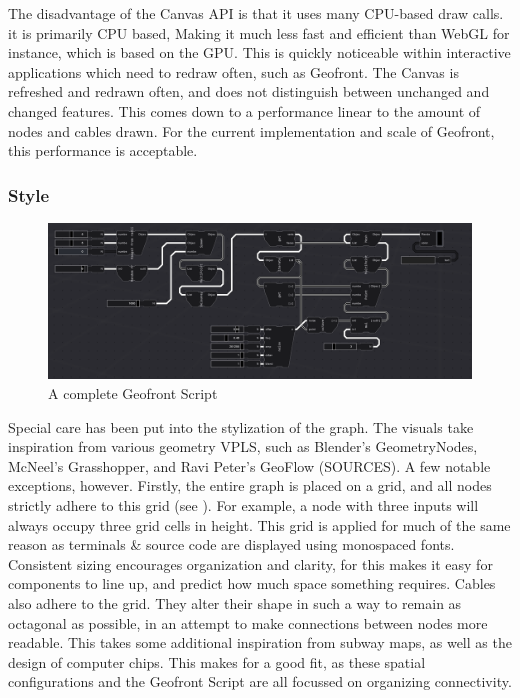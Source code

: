 The disadvantage of the Canvas API is that it uses many CPU-based draw calls. it is primarily CPU based, Making it much less fast and efficient than WebGL for instance, which is based on the GPU. 
This is quickly noticeable within interactive applications which need to redraw often, such as Geofront. 
The Canvas is refreshed and redrawn often, and does not distinguish between unchanged and changed features. 
This comes down to a performance linear to the amount of nodes and cables drawn. For the current implementation and scale of Geofront, this performance is acceptable. 

\subsubsection*{Style}

\begin{figure}
  \centering
  \graphicspath{ {../../assets/images/implementation/} }
  \includegraphics[width=\linewidth]{a-full-graph.png}
  \caption[Shim Classes]{A complete Geofront Script}
  \label{fig:a-full-graph}
\end{figure}

Special care has been put into the stylization of the graph.
The visuals take inspiration from various geometry VPLS, such as Blender's GeometryNodes, McNeel's Grasshopper, and Ravi Peter's GeoFlow (SOURCES). 
A few notable exceptions, however. 
Firstly, the entire graph is placed on a grid, and all nodes strictly adhere to this grid (see ). 
For example, a node with three inputs will always occupy three grid cells in height. 
This grid is applied for much of the same reason as terminals \& source code are displayed using monospaced fonts. 
Consistent sizing encourages organization and clarity, for this makes it easy for components to line up, and predict how much space something requires.  
Cables also adhere to the grid. They alter their shape in such a way to remain as octagonal as possible, in an attempt to make connections between nodes more readable.
This takes some additional inspiration from subway maps, as well as the design of computer chips. 
This makes for a good fit, as these spatial configurations and the Geofront Script are all focussed on organizing connectivity.

